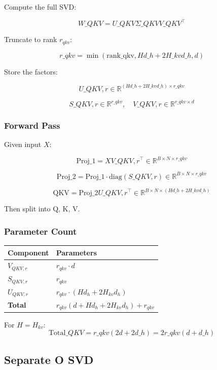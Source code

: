 Compute the full SVD:

\[
W\_{QKV} = U\_{QKV} \Sigma\_{QKV} V\_{QKV}^\top
\]

Truncate to rank $r_{qkv}$:

\[
r\_{qkv} = \min(\text{rank\_qkv}, H d\_h + 2 H\_{kv} d\_h, d)
\]

Store the factors:

\[
U\_{QKV, r} \in \mathbb{R}^{(H d\_h + 2 H\_{kv} d\_h) \times r\_{qkv}}
\]

\[
S\_{QKV, r} \in \mathbb{R}^{r\_{qkv}}, \quad
V\_{QKV, r} \in \mathbb{R}^{r\_{qkv} \times d}
\]

\subsubsection{Forward Pass}

Given input $X$:

\[
\text{Proj}\_1 = X V\_{QKV, r}^\top \in \mathbb{R}^{B \times N \times r\_{qkv}}
\]

\[
\text{Proj}\_2 = \text{Proj}\_1 \cdot \text{diag}(S\_{QKV, r}) \in \mathbb{R}^{B \times N \times r\_{qkv}}
\]

\[
\text{QKV} = \text{Proj}\_2 U\_{QKV, r}^\top \in \mathbb{R}^{B \times N \times (H d\_h + 2 H\_{kv} d\_h)}
\]

Then split into Q, K, V.

\subsubsection{Parameter Count}

\begin{table}[H]
\centering
\small
\begin{tabular}{ll}
\toprule
\textbf{Component} & \textbf{Parameters} \\
\midrule
$V_{QKV, r}$ & $r_{qkv} \cdot d$ \\
$S_{QKV, r}$ & $r_{qkv}$ \\
$U_{QKV, r}$ & $r_{qkv} \cdot (H d_h + 2 H_{kv} d_h)$ \\
\textbf{Total} & $r_{qkv} (d + H d_h + 2 H_{kv} d_h) + r_{qkv}$ \\
\bottomrule
\end{tabular}
\end{table}

For $H = H_{kv}$:
\[
\text{Total}\_{QKV} = r\_{qkv} (2d + 2 d\_h) = 2 r\_{qkv} (d + d\_h)
\]

\subsection{Separate O SVD}

